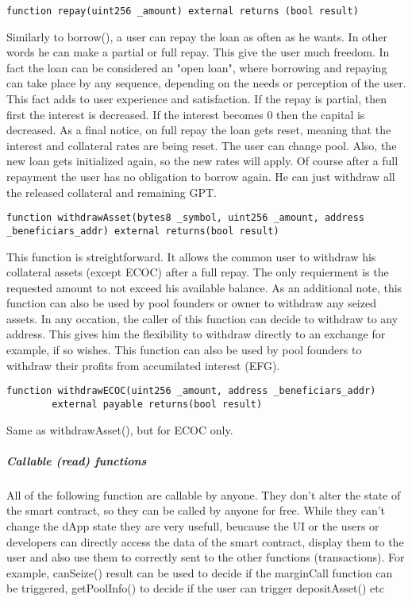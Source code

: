 \documentclass{article}
\begin{document}
\begin{lstlisting}[language=Solidity,numbers=none,escapechar=@]
function repay(uint256 _amount) external returns (bool result)
\end{lstlisting}
Similarly to borrow(), a user can repay the loan as often as he wants. In other words he can make a partial or full repay. This give the user much freedom. In fact the loan can be considered an "open loan", where borrowing and repaying can take place by any sequence, depending on the needs or perception of the user. This fact adds to user experience and satisfaction. If the repay is partial, then first the interest is decreased. If the interest becomes 0 then the capital is decreased. As a final notice, on full repay the loan gets reset, meaning that the interest and collateral rates are being reset. The user can change pool. Also, the new loan gets initialized again, so the new rates will apply. Of course after a full repayment the user has no obligation to borrow again. He can just withdraw all the released collateral and remaining GPT.

\begin{lstlisting}[language=Solidity,numbers=none,escapechar=@]
function withdrawAsset(bytes8 _symbol, uint256 _amount, address _beneficiars_addr) external returns(bool result)
\end{lstlisting}
This function is streightforward. It allows the common user to withdraw his collateral assets (except ECOC) after a full repay. The only requierment is the requested amount to not exceed his available balance. As an additional note, this function can also be used by pool founders or owner to withdraw any seized assets. In any occation, the caller of this function can decide to withdraw to any address. This gives him the flexibility to withdraw directly to an exchange for example, if so wishes. This function can also be used by pool founders to withdraw their profits from accumilated interest (EFG).

\begin{lstlisting}[language=Solidity,numbers=none,escapechar=@]
function withdrawECOC(uint256 _amount, address _beneficiars_addr)
        external payable returns(bool result)
\end{lstlisting}
Same as withdrawAsset(), but for ECOC only.


\subparagraph{Callable (read) functions}
All of the following function are callable by anyone. They don't alter the state of the smart contract, so they can be called by anyone for free. While they can't change the dApp state they are very usefull, beucause the UI or the users or developers can directly access the data of the smart contract, display them to the user and also use them to correctly sent to the other functions (transactions). For example, canSeize() result can be used to decide if the marginCall function can be triggered, getPoolInfo() to decide if the user can trigger depositAsset() etc
  
\end{document}
